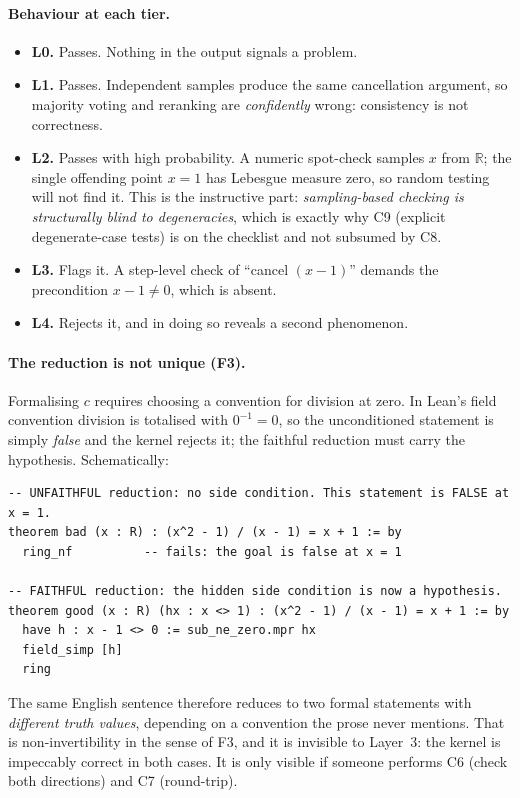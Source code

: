 \documentclass[11pt,a4paper]{article}
\theoremstyle{plain}
\theoremstyle{remark}
\begin{document}
\paragraph{Behaviour at each tier.}
\begin{itemize}[leftmargin=2.2em]
  \item \textbf{L0.}  Passes.  Nothing in the output signals a problem.
  \item \textbf{L1.}  Passes.  Independent samples produce the same
        cancellation argument, so majority voting and reranking are
        \emph{confidently} wrong: consistency is not correctness.
  \item \textbf{L2.}  Passes with high probability.  A numeric spot-check
        samples $x$ from $\mathbb{R}$; the single offending point $x=1$ has
        Lebesgue measure zero, so random testing will not find it.  This is the
        instructive part: \emph{sampling-based checking is structurally blind
        to degeneracies}, which is exactly why C9 (explicit degenerate-case
        tests) is on the checklist and not subsumed by C8.
  \item \textbf{L3.}  Flags it.  A step-level check of ``cancel $(x-1)$''
        demands the precondition $x-1\neq0$, which is absent.
  \item \textbf{L4.}  Rejects it, and in doing so reveals a second phenomenon.
\end{itemize}

\paragraph{The reduction is not unique (F3).}  Formalising $c$ requires
choosing a convention for division at zero.  In \textsf{Lean}'s field
convention division is totalised with $0^{-1}=0$, so the unconditioned
statement is simply \emph{false} and the kernel rejects it; the faithful
reduction must carry the hypothesis.  Schematically:
\begin{lstlisting}[caption={Illustrative \textsf{Lean} fragment.  Not executed
  or type-checked in this work; shown to make the side condition explicit.},
  label={lst:lean}]
-- UNFAITHFUL reduction: no side condition. This statement is FALSE at x = 1.
theorem bad (x : R) : (x^2 - 1) / (x - 1) = x + 1 := by
  ring_nf          -- fails: the goal is false at x = 1

-- FAITHFUL reduction: the hidden side condition is now a hypothesis.
theorem good (x : R) (hx : x <> 1) : (x^2 - 1) / (x - 1) = x + 1 := by
  have h : x - 1 <> 0 := sub_ne_zero.mpr hx
  field_simp [h]
  ring
\end{lstlisting}
The same English sentence therefore reduces to two formal statements with
\emph{different truth values}, depending on a convention the prose never
mentions.  That is non-invertibility in the sense of F3, and it is invisible to
Layer~3: the kernel is impeccably correct in both cases.  It is only visible if
someone performs C6 (check both directions) and C7 (round-trip).
\end{document}
